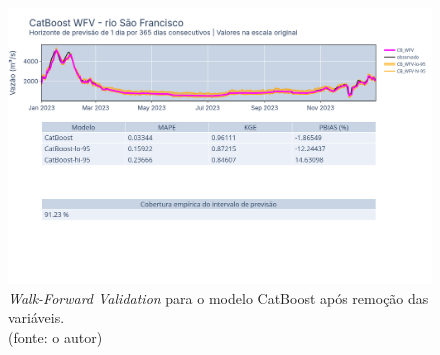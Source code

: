 \begin{figure}[!h]
\centering
\includegraphics[scale=0.33]{Figuras/rio_sao_francisco/wfv/CB/resultado melhorado sem as variaveis inferiores a 1.png}
\caption{\textit{Walk-Forward Validation} para o modelo CatBoost após remoção das variáveis.\\(fonte: o autor)}
\label{fig:francisco_resultados_melhorados_apos_remocao}
\end{figure}
\clearpage

%

